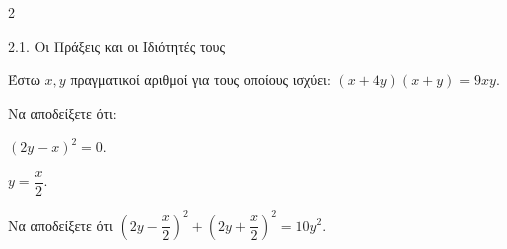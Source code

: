 \begin{ylh}{2}
    \item 2.1. Οι Πράξεις και οι Ιδιότητές τους
\end{ylh}
Έστω $x, y$ πραγματικοί αριθμοί για τους οποίους ισχύει: $(x + 4y)(x + y) = 9xy$.
\begin{alist}
\item Να αποδείξετε ότι:

\begin{rlist}
\item
   $(2y - x)^2 = 0$. 
\item
   $y = \dfrac{x}{2}$. 
\item Να αποδείξετε ότι $(2y - \dfrac{x}{2})^2 + (2y + \dfrac{x}{2})^2 = 10y^2$. 
\end{rlist}
\end{alist}

